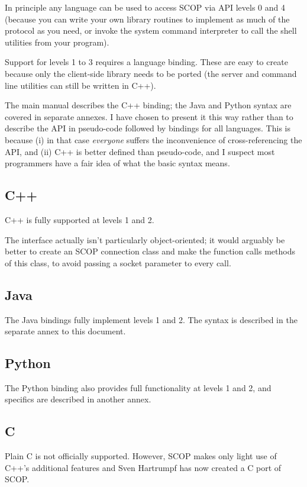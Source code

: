 \documentclass[12pt,a4paper,twoside]{article}
\renewcommand{\_}{\texttt{\symbol{95}}}
\begin{document}
In principle any language can be used to access SCOP via API levels 0
and 4 (because you can write your own library routines to implement as
much of the protocol as you need, or invoke the system command
interpreter to call the shell utilities from your program).

Support for levels 1 to 3 requires a language binding. These are easy
to create because only the client-side library needs to be ported (the
server and command line utilities can still be written in C++).

The main manual describes the C++ binding; the Java and Python syntax
are covered in separate annexes. I have chosen to present it this way
rather than to describe the API in pseudo-code followed by bindings for
all languages. This is because (i) in that case \textit{everyone}
suffers the inconvenience of cross-referencing the API, and (ii) C++ is
better defined than pseudo-code, and I suspect most programmers have a
fair idea of what the basic syntax means.

\subsection{C++}

C++ is fully supported at levels 1 and 2.

The interface actually isn't particularly object-oriented;
it would arguably be better to create an SCOP connection class
and make the function calls methods of this class, to avoid
passing a socket parameter to every call.

\subsection{Java}

The Java bindings fully implement levels 1 and 2. The syntax is
described in the separate annex to this document.

\subsection{Python}

The Python binding also provides full functionality at levels 1 and 2,
and specifics are described in another annex.

\subsection{C}

Plain C is not officially supported. However, SCOP makes only light use
of C++'s additional features and Sven Hartrumpf has now created a C
port of SCOP.
\end{document}
